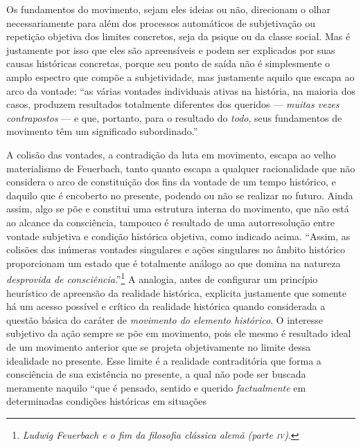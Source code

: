 Os fundamentos do movimento, sejam eles ideias ou não, direcionam o
olhar necessariamente para além dos processos automáticos de
subjetivação ou repetição objetiva dos limites concretos, seja da psique
ou da classe social. Mas é justamente por isso que eles são apreensíveis
e podem ser explicados por suas causas históricas concretas, porque seu
ponto de saída não é simplesmente o amplo espectro que compõe a
subjetividade, mas justamente aquilo que escapa ao arco da vontade: ``as
várias vontades individuais ativas na história, na maioria dos casos,
produzem resultados totalmente diferentes dos queridos --- \emph{muitas %
vezes contrapostos} --- e que, portanto, para o resultado do
\emph{todo}, seus fundamentos de movimento têm um significado
subordinado.''

A colisão das vontades, a contradição da luta em movimento, escapa ao
velho materialismo de Feuerbach, tanto quanto escapa a qualquer
racionalidade que não considera o arco de constituição dos fins da
vontade de um tempo histórico, e daquilo que é encoberto no presente,
podendo ou não se realizar no futuro. Ainda assim, algo se põe e
constitui uma estrutura interna do movimento, que não está ao alcance da
consciência, tampouco é resultado de uma autorresolução entre vontade
subjetiva e condição histórica objetiva, como indicado acima. ``Assim,
as colisões das inúmeras vontades singulares e ações singulares no
âmbito histórico proporcionam um estado que é totalmente análogo ao que
domina na natureza \emph{desprovida de consciência}.''\footnote{\emph{Ludwig
  Feuerbach e o fim da filosofia clássica alemã (parte \textsc{iv})}.} A
analogia, antes de configurar um princípio heurístico de apreensão da
realidade histórica, explicita justamente que somente há um acesso
possível e crítico da realidade histórica quando considerada a questão
básica do caráter de \emph{movimento do elemento histórico}. O interesse
subjetivo da ação sempre se põe em movimento, pois ele mesmo é resultado
ideal de um movimento anterior que se projeta objetivamente no limite
dessa idealidade no presente. Esse limite é a realidade contraditória
que forma a consciência de sua existência no presente, a qual não pode
ser buscada meramente naquilo ``que é pensado, sentido e querido
\emph{factualmente} em determinadas condições históricas em situações
